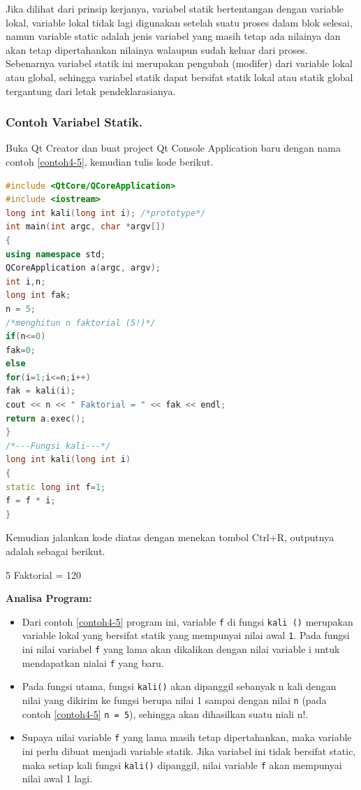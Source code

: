 Jika dilihat dari prinsip kerjanya, variabel statik bertentangan dengan
variable lokal, variable lokal tidak lagi digunakan setelah suatu proses
dalam blok selesai, namun variable static adalah jenis variabel yang
masih tetap ada nilainya dan akan tetap dipertahankan nilainya walaupun
sudah keluar dari proses. Sebenarnya variabel statik ini merupakan
pengubah (modifer) dari variable lokal atau global, sehingga variabel
statik dapat bersifat statik lokal atau statik global tergantung dari
letak pendeklarasianya.

\subsubsection*{Contoh  Variabel Statik.}

Buka Qt Creator dan buat project Qt Console Application baru dengan nama
contoh \ref{contoh4-5}, kemudian tulis kode berikut.

\begin{lstlisting}[language=c++, caption=Variabel Statik, label=contoh3]
#include <QtCore/QCoreApplication>
#include <iostream>
long int kali(long int i); /*prototype*/
int main(int argc, char *argv[])
{
using namespace std;
QCoreApplication a(argc, argv);
int i,n;
long int fak;
n = 5;
/*menghitun n faktorial (5!)*/
if(n<=0)
fak=0;
else
for(i=1;i<=n;i++)
fak = kali(i);
cout << n << " Faktorial = " << fak << endl;
return a.exec();
}
/*---Fungsi kali---*/
long int kali(long int i)
{
static long int f=1;
f = f * i;
}
\end{lstlisting}

Kemudian jalankan kode diatas dengan menekan tombol Ctrl+R, outputnya
adalah sebagai berikut.

\begin{lcverbatim}
5 Faktorial = 120
\end{lcverbatim} 

\textbf{Analisa Program:}

\begin{itemize}

\item
  Dari contoh \ref{contoh4-5} program ini, variable \texttt{f} di fungsi
  \texttt{kali\ ()} merupakan variable lokal yang bersifat statik yang
  mempunyai nilai awal \texttt{1}. Pada fungsi ini nilai variabel
  \texttt{f} yang lama akan dikalikan dengan nilai variable i untuk
  mendapatkan nialai \texttt{f} yang baru.\\
\item
  Pada fungsi utama, fungsi \texttt{kali()} akan dipanggil sebanyak n
  kali dengan nilai yang dikirim ke fungsi berupa nilai 1 sampai dengan
  nilai \texttt{n} (pada contoh \ref{contoh4-5} \texttt{n\ =\ 5}), sehingga akan
  dihasilkan suatu niali n!.\\
\item
  Supaya nilai variable \texttt{f} yang lama masih tetap dipertahankan,
  maka variable ini perlu dibuat menjadi variable statik. Jika variabel
  ini tidak bersifat static, maka setiap kali fungsi \texttt{kali()}
  dipanggil, nilai variable \texttt{f} akan mempunyai nilai awal 1 lagi.
\end{itemize}

